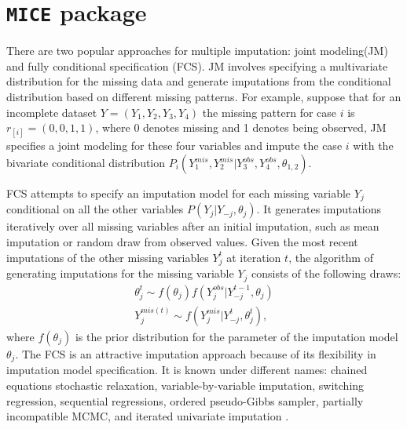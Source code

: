 \documentclass[12pt, fullpage, a4paper]{article}
\begin{document}
\section{\texttt{MICE} package}
There are two popular approaches for multiple imputation: joint modeling(JM) and fully conditional specification (FCS). JM involves specifying a multivariate distribution for the missing data and generate imputations from the conditional distribution based on different missing patterns. For example, suppose that for an incomplete dataset $Y = (Y_1, Y_2, Y_3, Y_4)$ the missing pattern for case $i$ is $r_{[i]} = (0, 0, 1, 1)$, where 0 denotes missing and 1 denotes being observed, JM specifies a joint modeling for these four variables and impute the case $i$ with the bivariate conditional distribution $P_{i}(Y_1^{mis}, Y_2^{mis} | Y_3^{obs}, Y_4^{obs}, \theta_{1,2})$. 

FCS attempts to specify an imputation model for each missing variable $Y_j$ conditional on all the other variables $P(Y_j | Y_{-j}, \theta_{j})$. It generates imputations iteratively over all missing variables after an initial imputation, such as mean imputation or random draw from observed values. Given the most recent imputations of the other missing variables $Y_{j}^{t}$ at iteration $t$, the algorithm of generating imputations for the missing variable $Y_{j}$ consists of the following draws:
\begin{align*}
\theta_{j}^{t} \sim f(\theta_{j})f(Y_{j}^{obs}|Y_{-j}^{t-1}, \theta_{j})\\
Y_{j}^{mis(t)} \sim f(Y_{j}^{mis}|Y_{-j}^{t}, \theta_{j}^{t}),
\end{align*}
where $f(\theta_{j})$ is the prior distribution for the parameter of the imputation model $\theta_{j}$.
The FCS is an attractive imputation approach because of its flexibility in imputation model specification. It is known under different names: chained equations stochastic relaxation, variable-by-variable imputation, switching regression, sequential regressions, ordered pseudo-Gibbs sampler, partially incompatible MCMC, and iterated univariate imputation \cite{van2007multiple}. 
\end{document}
